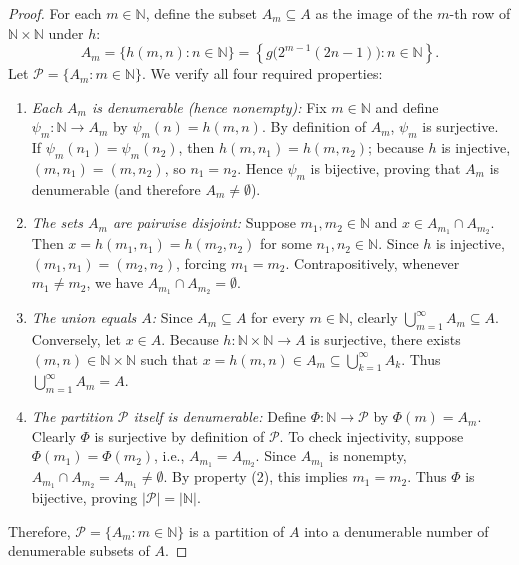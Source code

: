 \documentclass[11pt, letterpaper]{article}
\theoremstyle{definition}
\theoremstyle{remark}
\begin{document}
\begin{proof}
For each $m \in \mathbb{N}$, define the subset $A_m \subseteq A$ as the image of the $m$-th row of $\mathbb{N} \times \mathbb{N}$ under $h$:
\[
A_m = \{h(m, n) : n \in \mathbb{N}\} = \left\{g\bigl(2^{m-1}(2n - 1)\bigr) : n \in \mathbb{N}\right\}.
\]
Let $\mathcal{P} = \{A_m : m \in \mathbb{N}\}$. We verify all four required properties:
\begin{enumerate}[label=(\arabic*)]
    \item \emph{Each $A_m$ is denumerable (hence nonempty):} Fix $m \in \mathbb{N}$ and define $\psi_m : \mathbb{N} \to A_m$ by $\psi_m(n) = h(m, n)$. By definition of $A_m$, $\psi_m$ is surjective. If $\psi_m(n_1) = \psi_m(n_2)$, then $h(m, n_1) = h(m, n_2)$; because $h$ is injective, $(m, n_1) = (m, n_2)$, so $n_1 = n_2$. Hence $\psi_m$ is bijective, proving that $A_m$ is denumerable (and therefore $A_m \neq \emptyset$).
    \item \emph{The sets $A_m$ are pairwise disjoint:} Suppose $m_1, m_2 \in \mathbb{N}$ and $x \in A_{m_1} \cap A_{m_2}$. Then $x = h(m_1, n_1) = h(m_2, n_2)$ for some $n_1, n_2 \in \mathbb{N}$. Since $h$ is injective, $(m_1, n_1) = (m_2, n_2)$, forcing $m_1 = m_2$. Contrapositively, whenever $m_1 \neq m_2$, we have $A_{m_1} \cap A_{m_2} = \emptyset$.
    \item \emph{The union equals $A$:} Since $A_m \subseteq A$ for every $m \in \mathbb{N}$, clearly $\bigcup_{m=1}^{\infty} A_m \subseteq A$. Conversely, let $x \in A$. Because $h : \mathbb{N} \times \mathbb{N} \to A$ is surjective, there exists $(m, n) \in \mathbb{N} \times \mathbb{N}$ such that $x = h(m, n) \in A_m \subseteq \bigcup_{k=1}^{\infty} A_k$. Thus $\bigcup_{m=1}^{\infty} A_m = A$.
    \item \emph{The partition $\mathcal{P}$ itself is denumerable:} Define $\Phi : \mathbb{N} \to \mathcal{P}$ by $\Phi(m) = A_m$. Clearly $\Phi$ is surjective by definition of $\mathcal{P}$. To check injectivity, suppose $\Phi(m_1) = \Phi(m_2)$, i.e., $A_{m_1} = A_{m_2}$. Since $A_{m_1}$ is nonempty, $A_{m_1} \cap A_{m_2} = A_{m_1} \neq \emptyset$. By property (2), this implies $m_1 = m_2$. Thus $\Phi$ is bijective, proving $|\mathcal{P}| = |\mathbb{N}|$.
\end{enumerate}
Therefore, $\mathcal{P} = \{A_m : m \in \mathbb{N}\}$ is a partition of $A$ into a denumerable number of denumerable subsets of $A$.
\end{proof}

\end{document}
